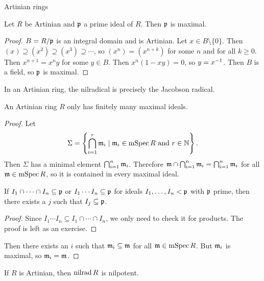 Artinian rings

\begin{prop}[3.31]
  Let $R$ be Artinian and $\mathfrak{p}$ a prime ideal of $R$.
  Then $\mathfrak{p}$ is maximal.
\end{prop}

\begin{proof}
  $B=R/\mathfrak{p}$ is an integral domain and is Artinian.
  Let $x \in B \setminus \{0\}$.
  Then $(x) \supseteq (x^2) \supseteq (x^3) \supseteq \cdots$, so $(x^n)=(x^{n+k})$ for some $n$ and for all $k \geq 0$.
  Then $x^{n+1}=x^ny$ for some $y \in B$.
  Then $x^n(1-xy)=0$, so $y=x^{-1}$.
  Then $B$ is a field, so $\mathfrak{p}$ is maximal.
\end{proof}

\begin{cor}[3.32]
  In an Artinian ring, the nilradical is precisely the Jacobson radical.
\end{cor}

\begin{prop}[3.33]
  An Artinian ring $R$ only has finitely many maximal ideals.
\end{prop}

\begin{proof}
  Let
  \[ \Sigma = \left\{ \bigcap_{i=1}^r \mathfrak{m}_i \mid \mathfrak{m}_i \in \operatorname{mSpec} R \text{ and } r \in \mathbb{N} \right\}. \]
  Then $\Sigma$ has a minimal element $\bigcap_{i=1}^n \mathfrak{m}_i$.
  Therefore $\mathfrak{m} \cap \bigcap_{i=1}^n \mathfrak{m}_i = \bigcap_{i=1}^n \mathfrak{m}_i$ for all $\mathfrak{m} \in \operatorname{mSpec} R$, so it is contained in every maximal ideal.

  \begin{lem}
    If $I_1 \cap \cdots \cap I_n \subseteq \mathfrak{p}$ or $I_1 \cdots I_n \subseteq \mathfrak{p}$ for ideals $I_1,\ldots,I_n<\mathfrak{p}$ with $\mathfrak{p}$ prime, then there exists a $j$ such that $I_j \subseteq \mathfrak{p}$.
  \end{lem}

  \begin{proof}
    Since $I_1 \cdots I_n \subseteq I_1 \cap \cdots \cap I_n$, we only need to check it for products.
    The proof is left as an exercise.
  \end{proof}

  Then there exists an $i$ such that $\mathfrak{m}_i \subseteq \mathfrak{m}$ for all $\mathfrak{m} \in \operatorname{mSpec} R$.
  But $\mathfrak{m}_i$ is maximal, so $\mathfrak{m}_i=\mathfrak{m}$.
\end{proof}

\begin{prop}[3.34]
  If $R$ is Artinian, then $\operatorname{nilrad} R$ is nilpotent.
\end{prop}

